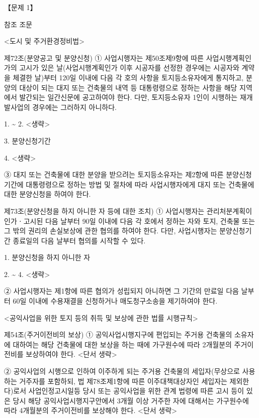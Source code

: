 \begin{longquestion}{【문제 1】}
\begin{framedtext}
참조 조문 \par
<도시 및 주거환경정비법> \par
제72조(분양공고 및 분양신청) ① 사업시행자는 제50조제9항에 따른 사업시행계획인가의 고시가 있은 날(사업시행계획인가 이후 시공자를 선정한 경우에는 시공자와 계약을 체결한 날)부터 120일 이내에 다음 각 호의 사항을 토지등소유자에게 통지하고, 분양의 대상이 되는 대지 또는 건축물의 내역 등 대통령령으로 정하는 사항을 해당 지역에서 발간되는 일간신문에 공고하여야 한다. 다만, 토지등소유자 1인이 시행하는 재개발사업의 경우에는 그러하지 아니하다. \par
1. \textasciitilde{} 2. <생략> \par
3. 분양신청기간 \par
4. <생략> \par
③ 대지 또는 건축물에 대한 분양을 받으려는 토지등소유자는 제2항에 따른 분양신청기간에 대통령령으로 정하는 방법 및 절차에 따라 사업시행자에게 대지 또는 건축물에 대한 분양신청을 하여야 한다. \par
제73조(분양신청을 하지 아니한 자 등에 대한 조치) ① 사업시행자는 관리처분계획이 인가ㆍ고시된 다음 날부터 90일 이내에 다음 각 호에서 정하는 자와 토지, 건축물 또는 그 밖의 권리의 손실보상에 관한 협의를 하여야 한다. 다만, 사업시행자는 분양신청기간 종료일의 다음 날부터 협의를 시작할 수 있다. \par
1. 분양신청을 하지 아니한 자 \par
2. \textasciitilde{} 4. <생략> \par
② 사업시행자는 제1항에 따른 협의가 성립되지 아니하면 그 기간의 만료일 다음 날부터 60일 이내에 수용재결을 신청하거나 매도청구소송을 제기하여야 한다. \par
<공익사업을 위한 토지 등의 취득 및 보상에 관한 법률 시행규칙> \par
제54조(주거이전비의 보상) ① 공익사업시행지구에 편입되는 주거용 건축물의 소유자에 대하여는 해당 건축물에 대한 보상을 하는 때에 가구원수에 따라 2개월분의 주거이전비를 보상하여야 한다. <단서 생략> \par
② 공익사업의 시행으로 인하여 이주하게 되는 주거용 건축물의 세입자(무상으로 사용하는 거주자를 포함하되, 법 제78조제1항에 따른 이주대책대상자인 세입자는 제외한다)로서 사업인정고시일등 당시 또는 공익사업을 위한 관계 법령에 따른 고시 등이 있은 당시 해당 공익사업시행지구안에서 3개월 이상 거주한 자에 대해서는 가구원수에 따라 4개월분의 주거이전비를 보상해야 한다. <단서 생략> \par
\end{framedtext}
\end{longquestion}
